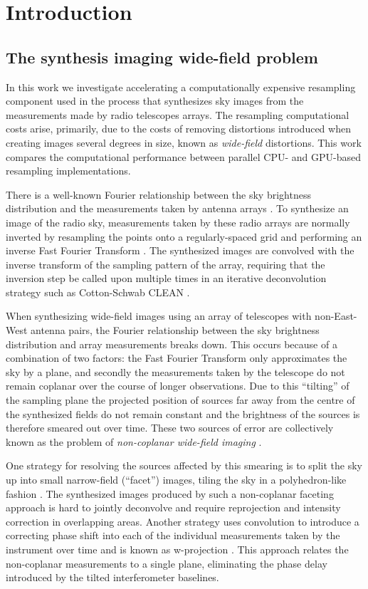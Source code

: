\chapter{Introduction}
\section{The synthesis imaging wide-field problem}
In this work we investigate accelerating a computationally expensive resampling component 
used in the process that synthesizes sky images from the measurements made by 
radio telescopes arrays. The resampling computational costs arise, primarily, due to the 
costs of removing distortions introduced when creating images several degrees in size, known
as \textit{wide-field} distortions. This work compares the computational performance between 
parallel CPU- and GPU-based resampling implementations.

There is a well-known Fourier relationship between the sky brightness distribution and the measurements taken by antenna arrays \cite[Lecture 1]{taylor1999synthesis}. 
To synthesize an image of the radio sky, measurements taken by these radio arrays are normally inverted by resampling the points onto a regularly-spaced grid and performing an inverse 
Fast Fourier Transform \cite{cochran1967fast,thompson1974interpolation}. The synthesized images are convolved with the inverse transform of the sampling pattern of the array, requiring that
the inversion step be called upon multiple times in an iterative deconvolution strategy such as Cotton-Schwab CLEAN \cite[ch 11]{thompson2008interferometry}.

When synthesizing wide-field images using an array of telescopes with non-East-West antenna pairs, the Fourier relationship between the sky brightness 
distribution and array measurements breaks down. This occurs because of a combination of two factors: the Fast Fourier Transform only approximates the sky by a plane, and secondly 
the measurements taken by the telescope do not remain coplanar over the course of longer observations. Due to this ``tilting'' of the sampling plane the projected position of 
sources far away from the centre of the synthesized fields do not remain constant and the brightness of the sources is therefore smeared out over time. These two sources of error are
collectively known as the problem of \textit{non-coplanar wide-field imaging} \cite{cornwell1992radio}.

One strategy for resolving the sources affected by this smearing is to split the sky up into small narrow-field (``facet'') images, tiling the sky in a 
polyhedron-like fashion \cite{cornwell1992radio}. The synthesized images produced by such a non-coplanar faceting approach is hard to jointly deconvolve and 
require reprojection and intensity correction in overlapping areas. Another strategy uses 
convolution to introduce a correcting phase shift into each of the individual measurements taken by the instrument over time and is known as w-projection \cite{cornwell2008noncoplanar}. This approach
relates the non-coplanar measurements to a single plane, eliminating the phase delay introduced by the tilted interferometer baselines. 

